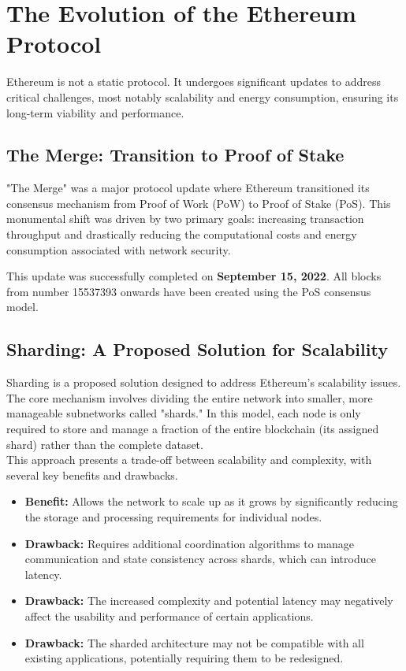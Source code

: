 \documentclass{scrbook}
\begin{document}
\section{The Evolution of the Ethereum Protocol}

Ethereum is not a static protocol. It undergoes significant updates to address critical challenges, most notably scalability and energy consumption, ensuring its long-term viability and performance.

\subsection{The Merge: Transition to Proof of Stake}

"The Merge" was a major protocol update where Ethereum transitioned its consensus mechanism from Proof of Work (PoW) to Proof of Stake (PoS). This monumental shift was driven by two primary goals: increasing transaction throughput and drastically reducing the computational costs and energy consumption associated with network security.

This update was successfully completed on \textbf{September 15, 2022}. All blocks from number 15537393 onwards have been created using the PoS consensus model.

\subsection{Sharding: A Proposed Solution for Scalability}

Sharding is a proposed solution designed to address Ethereum's scalability issues. The core mechanism involves dividing the entire network into smaller, more manageable subnetworks called "shards." In this model, each node is only required to store and manage a fraction of the entire blockchain (its assigned shard) rather than the complete dataset. \\

This approach presents a trade-off between scalability and complexity, with several key benefits and drawbacks.


\begin{itemize}
    \item \textbf{Benefit:} Allows the network to scale up as it grows by significantly reducing the storage and processing requirements for individual nodes.
    \item \textbf{Drawback:} Requires additional coordination algorithms to manage communication and state consistency across shards, which can introduce latency.
    \item \textbf{Drawback:} The increased complexity and potential latency may negatively affect the usability and performance of certain applications.
    \item \textbf{Drawback:} The sharded architecture may not be compatible with all existing applications, potentially requiring them to be redesigned.
\end{itemize}
\end{document}

